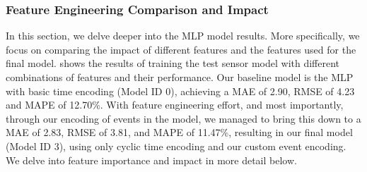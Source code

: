 \begin{table}[!ht]
\centering
\caption{MLP Tuned Architecture}
\label{table:mlp_architecture_details}
\end{table}

\subsubsection{Feature Engineering Comparison and Impact}
In this section, we delve deeper into the MLP model results. More specifically, we focus on comparing the impact of different features and the features used for the final model.  shows the results of training the test sensor model with different combinations of features and their performance. Our baseline model is the MLP with basic time encoding (Model ID 0), achieving a MAE of 2.90, RMSE of 4.23 and MAPE of 12.70\%. With feature engineering effort, and most importantly, through our encoding of events in the model, we managed to bring this down to a MAE of 2.83, RMSE of 3.81, and MAPE of 11.47\%, resulting in our final model (Model ID 3), using only cyclic time encoding and our custom event encoding. We delve into feature importance and impact in more detail below.


